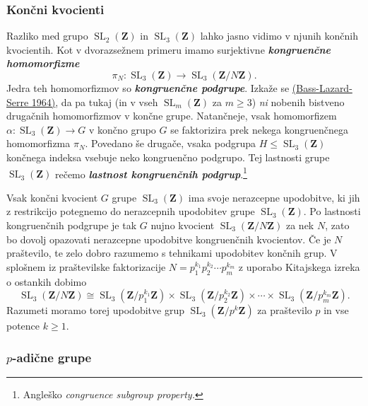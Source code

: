 \documentclass[11pt]{book}
\def\ZZ{\mathbf{Z}}
\DeclareMathOperator\SL{SL}
\def\definicija{\color{rdeca}\bf\em}
\theoremstyle{definition}
\theoremstyle{zgled}
\theoremstyle{odprtproblem}
\theoremstyle{domacanaloga}
\theoremstyle{izrek}
\begin{document}
\subsubsection{Končni kvocienti}

Razliko med grupo $\SL_2(\ZZ)$ in $\SL_3(\ZZ)$ lahko jasno vidimo v njunih končnih kvocientih. Kot v dvorazsežnem primeru imamo surjektivne {\definicija kongruenčne homomorfizme}
\[
    \textstyle \pi_N \colon \SL_3(\ZZ) \to \SL_3(\ZZ/N\ZZ).
\]
Jedra teh homomorfizmov so {\definicija kongruenčne podgrupe}. Izkaže se \href{https://projecteuclid.org/journals/bulletin-of-the-american-mathematical-society-new-series/volume-70/issue-3/Sous-groupes-dindice-fini-dans-SLleft-nZ-right/bams/1183526018.full}{(Bass-Lazard-Serre 1964)}, da pa tukaj (in v vseh $\SL_m(\ZZ)$ za $m \geq 3$) \emph{ni} nobenih bistveno drugačnih homomorfizmov v končne grupe. Natančneje, vsak homomorfizem $\alpha \colon \SL_3(\ZZ) \to G$ v končno grupo $G$ se faktorizira prek nekega kongruenčnega homomorfizma $\pi_N$. Povedano še drugače, vsaka podgrupa $H \leq \SL_3(\ZZ)$ končnega indeksa vsebuje neko kongruenčno podgrupo. Tej lastnosti grupe $\SL_3(\ZZ)$ rečemo {\definicija lastnost kongruenčnih podgrup}.\footnote{Angleško \emph{congruence subgroup property.}}

Vsak končni kvocient $G$ grupe $\SL_3(\ZZ)$ ima svoje nerazcepne upodobitve, ki jih z restrikcijo potegnemo do nerazcepnih upodobitev grupe $\SL_3(\ZZ)$. Po lastnosti kongruenčnih podgrupe je tak $G$ nujno kvocient $\SL_3(\ZZ/N\ZZ)$ za nek $N$, zato bo dovolj opazovati nerazcepne upodobitve kongruenčnih kvocientov. Če je $N$ praštevilo, te zelo dobro razumemo s tehnikami upodobitev končnih grup. V splošnem iz praštevilske faktorizacije $N = p_1^{k_1} p_2^{k_2} \cdots p_m^{k_m}$ z uporabo Kitajskega izreka o ostankih dobimo
\[
    \textstyle \SL_3(\ZZ/N\ZZ) \cong \SL_3(\ZZ/p_1^{k_1}\ZZ) \times \SL_3(\ZZ/p_2^{k_2}\ZZ) \times \cdots \times \SL_3(\ZZ/p_m^{k_m}\ZZ).
\]
Razumeti moramo torej upodobitve grup $\SL_3(\ZZ/p^k\ZZ)$ za praštevilo $p$ in vse potence $k \geq 1$. 

\subsubsection{$p$-adične grupe}
\end{document}
